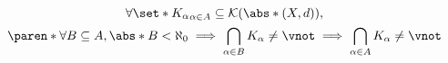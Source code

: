 \begin{theorem} \label{an1:thm:finite-compact-intersection-property}
  \[
    \begin{gathered}
      \forall \set*{K_{\alpha}}_{\alpha \in A} \subseteq \mathcal{K}(\abs*{(X, d)}), \\
      \paren*{\forall B \subseteq A, \abs*{B} < \aleph_{0} \implies \bigcap_{\alpha \in B} K_{\alpha} \neq \vnot}
      \implies \bigcap_{\alpha \in A} K_{\alpha} \neq \vnot
    \end{gathered}
  \]
\end{theorem}
